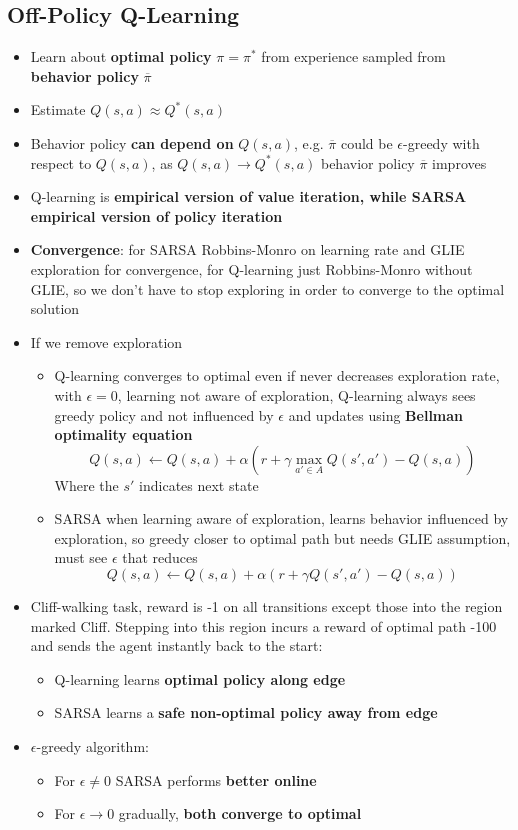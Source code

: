 \subsection{Off-Policy Q-Learning}
    \begin{itemize}
        \item Learn about \textbf{optimal policy} $\pi=\pi^*$ from experience sampled from \textbf{behavior policy} $\overline{\pi}$
        \item Estimate $Q(s,a)\approx Q^*(s,a)$
        \item Behavior policy \textbf{can depend on} $Q(s,a)$, e.g. $\overline{\pi}$ could be $\epsilon$-greedy with respect to $Q(s,a)$, as $Q(s,a)\rightarrow Q^*(s,a)$ behavior policy $\overline{\pi}$ improves
        \item Q-learning is \textbf{empirical version of value iteration, while SARSA empirical version of policy iteration}
        \item \textbf{Convergence}: for SARSA Robbins-Monro on learning rate and GLIE exploration for convergence, for Q-learning just Robbins-Monro without GLIE, so we don't have to stop exploring in order to converge to the optimal solution
        \item If we remove exploration
        \begin{itemize}
            \item Q-learning converges to optimal even if never decreases exploration rate, with $\epsilon=0$, learning not aware of exploration, Q-learning always sees greedy policy and not influenced by $\epsilon$ and updates using \textbf{Bellman optimality equation}
            $$Q(s,a)\leftarrow Q(s,a)+\alpha(r+\gamma \max_{a'\in A}Q(s',a')-Q(s,a))$$
            Where the $s'$ indicates next state
            \item SARSA when learning aware of exploration, learns behavior influenced by exploration, so greedy closer to optimal path but needs GLIE assumption, must see $\epsilon$ that reduces
            $$Q(s,a)\leftarrow Q(s,a)+\alpha(r+\gamma Q(s',a')-Q(s,a))$$
        \end{itemize}
        \item Cliff-walking task, reward is -1 on all transitions except those into the region marked Cliff. Stepping into this region incurs a reward of optimal path -100 and sends the agent instantly back to the start:
        \begin{itemize}
            \item Q-learning learns \textbf{optimal policy along edge}
            \item SARSA learns a \textbf{safe non-optimal policy away from edge}
        \end{itemize}
        \item $\epsilon$-greedy algorithm:
        \begin{itemize}
            \item For $\epsilon\neq 0$ SARSA performs \textbf{better online}
            \item For $\epsilon\rightarrow 0$ gradually, \textbf{both converge to optimal}
        \end{itemize}
    \end{itemize}
